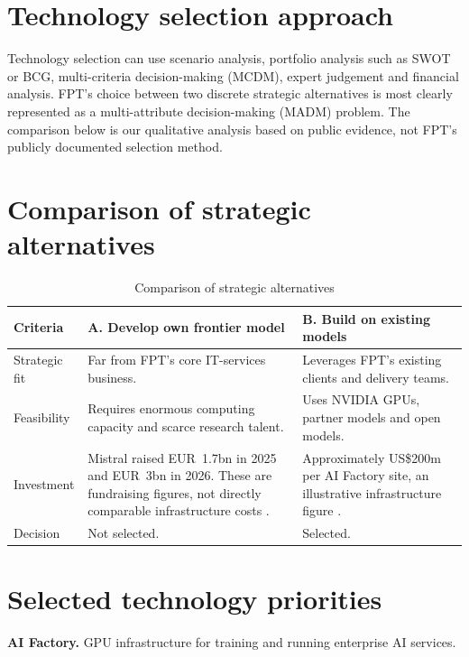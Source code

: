 \documentclass[a4paper,12pt]{report}
\begin{document}
\section{Technology selection approach}

Technology selection can use scenario analysis, portfolio analysis such as SWOT or BCG, multi-criteria decision-making (MCDM), 
expert judgement and financial analysis. FPT's choice between two discrete strategic alternatives is most clearly represented as 
a multi-attribute decision-making (MADM) problem. The comparison below is our qualitative analysis based on public evidence, not 
FPT's publicly documented selection method.

\section{Comparison of strategic alternatives}

\begin{table}[H]
\centering
\caption{Comparison of strategic alternatives}
\label{tab:technology-selection}
\renewcommand{\arraystretch}{1.15}
\begin{tabular}{p{} p{} p{}}
\toprule
\textbf{Criteria} & \textbf{A. Develop own frontier model} & \textbf{B. Build on existing models} \\
\midrule
Strategic fit & Far from FPT's core IT-services business. & Leverages FPT's existing clients and delivery teams. \\
Feasibility & Requires enormous computing capacity and scarce research talent. & Uses NVIDIA GPUs, partner models and open models. \\
Investment & Mistral raised EUR~1.7bn in 2025 and EUR~3bn in 2026. These are fundraising figures, not directly comparable infrastructure costs \cite{S20,S21}. & Approximately US\$200m per AI Factory site, an illustrative infrastructure figure \cite{A17}. \\
Decision & Not selected. & Selected. \\
\bottomrule
\end{tabular}
\end{table}

\section{Selected technology priorities}

\textbf{AI Factory.} GPU infrastructure for training and running enterprise AI services.
\end{document}
